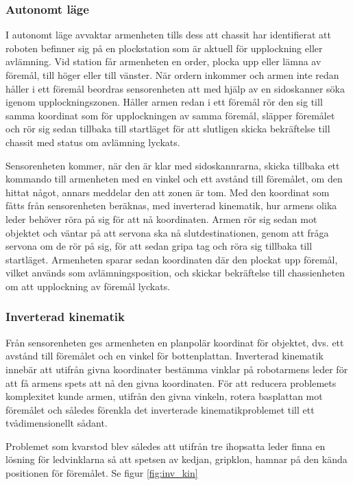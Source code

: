 \subsubsection{Autonomt läge}

I autonomt läge avvaktar armenheten tills dess att chassit har identifierat att roboten befinner sig på en plockstation som är aktuell för upplockning eller avlämning. Vid station får armenheten en order, plocka upp eller lämna av föremål, till höger eller till vänster. När ordern inkommer och armen inte redan håller i ett föremål beordras sensorenheten att med hjälp av en sidoskanner söka igenom upplockningszonen. Håller armen redan i ett föremål rör den sig till samma koordinat som för upplockningen av samma föremål, släpper föremålet och rör sig sedan tillbaka till startläget för att slutligen skicka bekräftelse till chassit med status om avlämning lyckats.

Sensorenheten kommer, när den är klar med sidoskannrarna, skicka tillbaka ett kommando till armenheten med en vinkel och ett avstånd till föremålet, om den hittat något, annars meddelar den att zonen är tom. Med den koordinat som fåtts från sensorenheten beräknas, med inverterad kinematik, hur armens olika leder behöver röra på sig för att nå koordinaten. Armen rör sig sedan mot objektet och väntar på att servona ska nå slutdestinationen, genom att fråga servona om de rör på sig, för att sedan gripa tag och röra sig tillbaka till startläget. Armenheten sparar sedan koordinaten där den plockat upp föremål, vilket används som avlämningsposition, och skickar bekräftelse till chassienheten om att upplockning av föremål lyckats. 

\subsubsection{Inverterad kinematik}
\label{sec:inverskinematik}

Från sensorenheten ges armenheten en planpolär koordinat för objektet, dvs. ett avstånd till föremålet och en vinkel för bottenplattan. Inverterad kinematik innebär att utifrån givna koordinater bestämma vinklar på robotarmens leder för att få armens spets att nå den givna koordinaten. För att reducera problemets komplexitet kunde armen, utifrån den givna vinkeln, rotera basplattan mot föremålet och således förenkla det inverterade kinematikproblemet till ett tvådimensionellt sådant.

Problemet som kvarstod blev således att utifrån tre ihopsatta leder finna en lösning för ledvinklarna så att spetsen av kedjan, gripklon, hamnar på den kända positionen för föremålet. Se figur \ref{fig:inv_kin}

